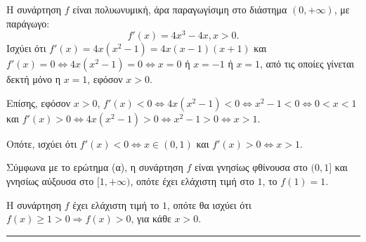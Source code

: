 \begin{alist}
    \item Η συνάρτηση $f$ είναι πολυωνυμική, άρα παραγωγίσιμη στο διάστημα $(0, +\infty)$, με παράγωγο:
    \[ f'(x) = 4x^3 - 4x, x > 0. \]
    Ισχύει ότι $f'(x) = 4x(x^2 - 1) = 4x(x-1)(x+1)$ και $f'(x) = 0 \Leftrightarrow 4x(x^2 - 1) = 0 \Leftrightarrow x = 0$ ή $x = -1$ ή $x = 1$, από τις οποίες γίνεται δεκτή μόνο η $x = 1$, εφόσον $x > 0$.
    
    Επίσης, εφόσον $x > 0$, $f'(x) < 0 \Leftrightarrow 4x(x^2 - 1) < 0 \Leftrightarrow x^2 - 1 < 0 \Leftrightarrow 0 < x < 1$ και
    $f'(x) > 0 \Leftrightarrow 4x(x^2 - 1) > 0 \Leftrightarrow x^2 - 1 > 0 \Leftrightarrow x > 1$.
    
    Οπότε, ισχύει ότι $f'(x) < 0 \Leftrightarrow x \in (0,1)$ και $f'(x) > 0 \Leftrightarrow x > 1$.
    
    \item Σύμφωνα με το ερώτημα (α), η συνάρτηση $f$ είναι γνησίως φθίνουσα στο $(0,1]$ και γνησίως αύξουσα στο $[1, +\infty)$, οπότε έχει ελάχιστη τιμή στο $1$, το $f(1) = 1$.
    
    \item Η συνάρτηση $f$ έχει ελάχιστη τιμή το $1$, οπότε θα ισχύει ότι $f(x) \geq 1 > 0 \Rightarrow f(x) > 0$, για κάθε $x > 0$.
\end{alist}
\vspace{6mm}
\noindent\rule{\textwidth}{0.4pt}
\vspace{6mm}

